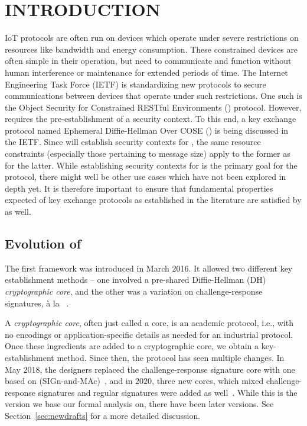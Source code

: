\documentclass[runningheads]{llncs}
\begin{document}
\section{\uppercase{Introduction}}
\label{sec:introduction}
IoT protocols are often run on devices which operate under severe restrictions
on resources like bandwidth and energy consumption.
%
These constrained devices are often simple in their operation, but need to
communicate and function without human interference or maintenance for
extended periods of time.
%
The Internet Engineering Task Force (IETF) is standardizing new protocols to secure communications between devices that operate under such restrictions.
%
One such is the Object Security for Constrained RESTful Environments
(\mOscore{}) protocol.
%
However, \mOscore{} requires the pre-establishment of a security context.
%
To this end, a key exchange protocol named Ephemeral Diffie-Hellman Over
COSE
(\mEdhoc{}) is being discussed in the IETF.
%
Since \mEdhoc{} will establish security contexts for \mOscore{}, the same
resource constraints (especially those pertaining to message size) apply to the
former as for the latter.
%
While establishing security contexts for \mOscore{} is the primary goal for the
\mEdhoc{} protocol, there might well be other use cases which have not been
explored in depth yet.
%
It is therefore important to ensure that fundamental properties
expected of key exchange protocols as established in the literature are satisfied
by \mEdhoc{} as well.
%

\subsection{Evolution of \mEdhoc}
\label{sec:edhocevol}
The first \mEdhoc{} framework was introduced in March 2016.
%
It allowed two different key establishment methods -- one involved a pre-shared
Diffie-Hellman (DH) \emph{cryptographic core}, and the other was a
variation on challenge-response signatures, {\`a} la
\mOptls{}~\cite{DBLP:conf/eurosp/KrawczykW16}.

%
A \emph{cryptographic core}, often just called a core, is an academic protocol,
i.e., with no encodings or application-specific details as needed for an
industrial protocol.
%
Once these ingredients are added to a cryptographic core, we obtain a
key-establishment method.
%
Since then, the protocol has seen multiple changes.
%
In May 2018, the designers replaced the challenge-response signature core with
one based on \mSigma{}
(SIGn-and-MAc)~\cite{sigma,bruni-analysis-selander-ace-cose-ecdhe-08}, and
in
2020, three new cores, which mixed challenge-response signatures and regular
signatures were added as well~\cite{our-analysis-selander-lake-edhoc-00}.
%
While this is the version we base our formal analysis on, there have been later versions. 
%
See Section~\ref{sec:newdrafts} for a more detailed discussion.
\end{document}
